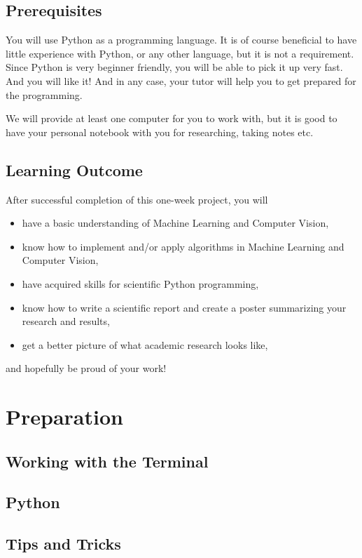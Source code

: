 \documentclass[]{article}
\begin{document}
	\subsection{Prerequisites}
		You will use Python as a programming language. 
		It is of course beneficial to have little experience with Python, or any other language, but it is not a requirement.
		Since Python is very beginner friendly, you will be able to pick it up very fast. 
		And you will like it!
		And in any case, your tutor will help you to get prepared for the programming.
		
		We will provide at least one computer for you to work with, but it is good to have your personal notebook with you for researching, taking notes etc.
	
	\subsection{Learning Outcome}
		After successful completion of this one-week project, you will  %
		\begin{itemize}
			\item have a basic understanding of Machine Learning and Computer Vision,
			\item know how to implement and/or apply algorithms in Machine Learning and Computer Vision,
			\item have acquired skills for scientific Python programming,
			\item know how to write a scientific report and create a poster summarizing your research and results,
			\item get a better picture of what academic research looks like,
		\end{itemize}
		and hopefully be proud of your work!
	

\section{Preparation}
	\subsection{Working with the Terminal}
	
	\subsection{Python}
	
	\subsection{Tips and Tricks}
	
\end{document}

